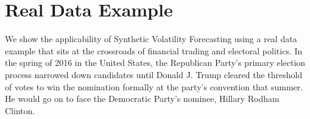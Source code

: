 \documentclass[11pt]{article}
\theoremstyle{definition}
\begin{document}

\section{Real Data Example}

We show the applicability of Synthetic Volatility Forecasting using a real data example that sits at the crossroads of financial trading and electoral politics.  In the spring of 2016 in the United States, the Republican Party's primary election process narrowed down candidates until Donald J. Trump cleared the threshold of votes to win the nomination formally at the party's convention that summer.  He would go on to face the Democratic Party's nominee, Hillary Rodham Clinton.   
\end{document}
